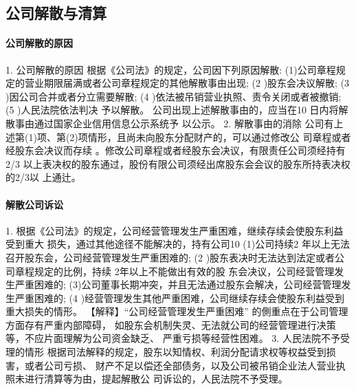 \documentclass[UTF8,12pt]{ctexart}
\numberwithin{equation}{section} %
\numberwithin{figure}{section}
\numberwithin{table}{section}
\begin{document}
	
	\subsection{公司解散与清算}
	\paragraph{公司解散的原因}
	1. 公司解散的原因
	根据《公司法》的规定，公司因下列原因解散: (1)公司章程规定的营业期限届满或者公司章程规定的其他解散事由出现;
	(2 )股东会决议解散;
	(3 )因公司合并或者分立需要解散;
	(4 )依法被吊销营业执照、责令关闭或者被撤销;
	(5 )人民法院依法判决 予以解散。
	公司出现上述解散事由的，应当在10 日内将解散事由通过国家企业信用信息公示系统予 以公示。
	2. 解散事由的消除 公司有上述第(1)项、第(2)项情形，且尚未向股东分配财产的，可以通过修改公 司章程或者经股东会决议而存续 。修改公司章程或者经股东会决议，有限责任公司须经持有 2/3 以上表决权的股东通过，股份有限公司须经出席股东会会议的股东所持表决权的2/3以 上通辻。
	
	\paragraph{解散公司诉讼}
	1. 根据《公司法》的规定，公司经营管理发生严重困难，继续存续会使股东利益受到重大 损失，通过其他途径不能解决的，持有公司10%
	(1)公司持续2 年以上无法召开股东会，公司经营管理发生严重困难的;
	(2 )股东表决时无法达到法定或者公司章程规定的比例，持续 2年以上不能做出有效的股 东会决议，公司经营管理发生严重困难的; (3)公司董事长期冲突，并且无法通过股东会解决，公司经营管理发生严重困难的;
	(4 )经营管理发生其他严重困难，公司继续存续会使股东利益受到重大损失的情形。
	【解释】“公司经营管理发生严重困难” 的側重点在于公司管理方面存有严重内部障碍， 如股东会机制失灵、无法就公司的经营管理进行决策等，不应片面理解为公司资金缺乏、 严重亏损等经营性困难。
	3. 人民法院不予受理的情形 根据司法解释的规定，股东以知情权、利润分配请求权等权益受到损害，或者公司亏损、 财产不足以偿还全部债务，以及公司被吊销企业法人营业执照未进行清算等为由，提起解散公 司诉讼的，人民法院不予受理。
	
\end{document}
